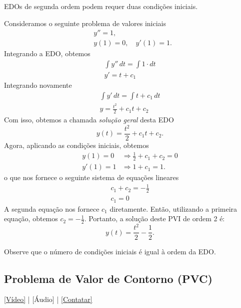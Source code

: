 EDOs de segunda ordem podem requer duas condições iniciais.

\begin{ex}
  Consideramos o seguinte problema de valores iniciais
  \begin{align}
    &y'' = 1,\\
    &y(1) = 0,\quad y'(1) = 1.
  \end{align}
  Integrando a EDO, obtemos
  \begin{gather}
    \int y''\,dt = \int 1\cdot dt\\
    y' = t + c_1
  \end{gather}
  Integrando novamente
  \begin{gather}
    \int y'\,dt = \int t + c_1\,dt\\
    y = \frac{t^2}{2} + c_1t + c_2
  \end{gather}
  Com isso, obtemos a chamada \emph{solução geral} desta EDO
  \begin{equation}
    y(t) = \frac{t^2}{2} + c_1t + c_2.
  \end{equation}
  Agora, aplicando as condições iniciais, obtemos
  \begin{align}
    y(1) = 0 &\Rightarrow \frac{1}{2} + c_1 + c_2 = 0\\
    y'(1) = 1 &\Rightarrow 1 + c_1 = 1.
  \end{align}
  o que nos fornece o seguinte sistema de equações lineares
  \begin{gather}
    c_1 + c_2 = -\frac{1}{2}\\
    c_1 = 0
  \end{gather}
  A segunda equação nos fornece $c_1$ diretamente. Então, utilizando a primeira equação, obtemos $c_2 = -\frac{1}{2}$. Portanto, a solução deste PVI de ordem 2 é:
  \begin{equation}
    y(t) = \frac{t^2}{2} - \frac{1}{2}.
  \end{equation}
\end{ex}


\begin{obs}
  Observe que o número de condições iniciais é igual à ordem da EDO.
\end{obs}

\subsection{Problema de Valor de Contorno (PVC)}

\begin{flushright}
  \href{https://archive.org/details/edo-pvc}{[Vídeo]} | [Áudio] | \href{https://phkonzen.github.io/notas/contato.html}{[Contatar]}
\end{flushright}

